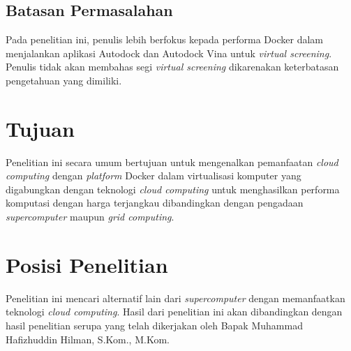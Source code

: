 \subsection{Batasan Permasalahan}
\hspace{0.5cm}Pada penelitian ini, penulis lebih berfokus kepada performa Docker dalam menjalankan aplikasi Autodock dan Autodock Vina untuk \textit{virtual screening}. Penulis tidak akan membahas segi \textit{virtual screening} dikarenakan keterbatasan pengetahuan yang dimiliki. 

\section{Tujuan}
\hspace{0.5cm}Penelitian ini secara umum bertujuan untuk mengenalkan pemanfaatan \textit{cloud computing} dengan \textit{platform} Docker dalam virtualisasi komputer yang digabungkan dengan teknologi \textit{cloud computing} untuk menghasilkan performa komputasi dengan harga terjangkau dibandingkan dengan pengadaan \textit{supercomputer} maupun \textit{grid computing}.


\section{Posisi Penelitian}
\hspace{0.5cm}Penelitian ini mencari alternatif lain dari \textit{supercomputer} dengan memanfaatkan teknologi \textit{cloud computing}. Hasil dari penelitian ini akan dibandingkan dengan hasil penelitian serupa yang telah dikerjakan oleh Bapak Muhammad Hafizhuddin Hilman, S.Kom., M.Kom.

